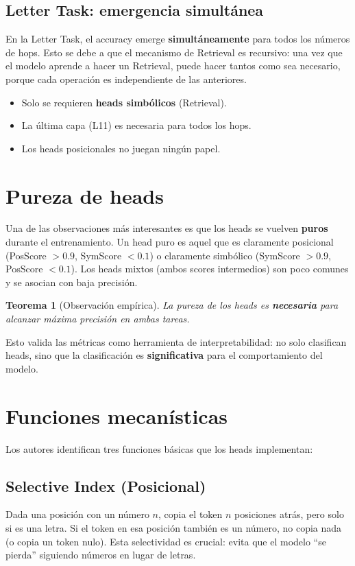 \documentclass[12pt,a4paper,oneside]{report}
\newtheorem{theorem}{Teorema}[chapter]
\begin{document}
\subsection{Letter Task: emergencia simultánea}

En la Letter Task, el accuracy emerge \textbf{simultáneamente} para todos los números de hops. Esto se debe a que el mecanismo de Retrieval es recursivo: una vez que el modelo aprende a hacer un Retrieval, puede hacer tantos como sea necesario, porque cada operación es independiente de las anteriores.

\begin{itemize}
    \item Solo se requieren \textbf{heads simbólicos} (Retrieval).
    \item La última capa (L11) es necesaria para todos los hops.
    \item Los heads posicionales no juegan ningún papel.
\end{itemize}

\section{Pureza de heads}

Una de las observaciones más interesantes es que los heads se vuelven \textbf{puros} durante el entrenamiento. Un head puro es aquel que es claramente posicional (PosScore $> 0.9$, SymScore $< 0.1$) o claramente simbólico (SymScore $> 0.9$, PosScore $< 0.1$). Los heads mixtos (ambos scores intermedios) son poco comunes y se asocian con baja precisión.

\begin{theorem}[Observación empírica]
La pureza de los heads es \textbf{necesaria} para alcanzar máxima precisión en ambas tareas.
\end{theorem}

Esto valida las métricas como herramienta de interpretabilidad: no solo clasifican heads, sino que la clasificación es \textbf{significativa} para el comportamiento del modelo.

\section{Funciones mecanísticas}

Los autores identifican tres funciones básicas que los heads implementan:

\subsection{Selective Index (Posicional)}
Dada una posición con un número $n$, copia el token $n$ posiciones atrás, pero solo si es una letra. Si el token en esa posición también es un número, no copia nada (o copia un token nulo). Esta selectividad es crucial: evita que el modelo ``se pierda'' siguiendo números en lugar de letras.
\end{document}
